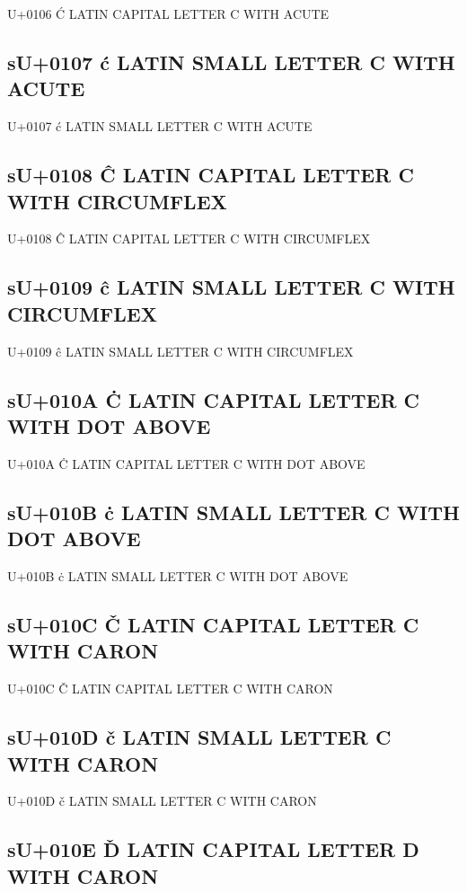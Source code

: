 U+0106 Ć  LATIN CAPITAL LETTER C WITH ACUTE

\subsection{sU+0107 ć  LATIN SMALL LETTER C WITH ACUTE}

U+0107 ć  LATIN SMALL LETTER C WITH ACUTE

\subsection{sU+0108 Ĉ  LATIN CAPITAL LETTER C WITH CIRCUMFLEX}

U+0108 Ĉ  LATIN CAPITAL LETTER C WITH CIRCUMFLEX

\subsection{sU+0109 ĉ  LATIN SMALL LETTER C WITH CIRCUMFLEX}

U+0109 ĉ  LATIN SMALL LETTER C WITH CIRCUMFLEX

\subsection{sU+010A Ċ  LATIN CAPITAL LETTER C WITH DOT ABOVE}

U+010A Ċ  LATIN CAPITAL LETTER C WITH DOT ABOVE

\subsection{sU+010B ċ  LATIN SMALL LETTER C WITH DOT ABOVE}

U+010B ċ  LATIN SMALL LETTER C WITH DOT ABOVE

\subsection{sU+010C Č  LATIN CAPITAL LETTER C WITH CARON}

U+010C Č  LATIN CAPITAL LETTER C WITH CARON

\subsection{sU+010D č  LATIN SMALL LETTER C WITH CARON}

U+010D č  LATIN SMALL LETTER C WITH CARON

\subsection{sU+010E Ď  LATIN CAPITAL LETTER D WITH CARON}

